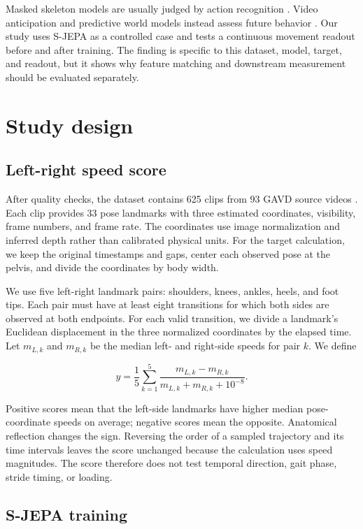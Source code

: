 \documentclass{article}
\begin{document}
Masked skeleton models are usually judged by action recognition
\citep{sjepa} \citep{mamp} \citep{slim}. Video anticipation and
predictive world models instead assess future behavior \citep{vjepa2}
\citep{seqjepa}. Our study uses S-JEPA as a controlled case and tests a
continuous movement readout before and after training. The finding is
specific to this dataset, model, target, and readout, but it shows why
feature matching and downstream measurement should be evaluated
separately.

\section{Study design}\label{study-design}

\subsection{Left-right speed score}\label{left-right-speed-score}

After quality checks, the dataset contains 625 clips from 93 GAVD source
videos \citep{gavd}. Each clip provides 33 pose landmarks with three
estimated coordinates, visibility, frame numbers, and frame rate. The
coordinates use image normalization and inferred depth rather than
calibrated physical units. For the target calculation, we keep the
original timestamps and gaps, center each observed pose at the pelvis,
and divide the coordinates by body width.

We use five left-right landmark pairs: shoulders, knees, ankles, heels,
and foot tips. Each pair must have at least eight transitions for which
both sides are observed at both endpoints. For each valid transition, we
divide a landmark's Euclidean displacement in the three normalized
coordinates by the elapsed time. Let \(m_{L,k}\) and \(m_{R,k}\) be the
median left- and right-side speeds for pair \(k\). We define

\[y=\frac{1}{5}\sum_{k=1}^{5}\frac{m_{L,k}-m_{R,k}}{m_{L,k}+m_{R,k}+10^{-8}}.\]

Positive scores mean that the left-side landmarks have higher median
pose-coordinate speeds on average; negative scores mean the opposite.
Anatomical reflection changes the sign. Reversing the order of a sampled
trajectory and its time intervals leaves the score unchanged because the
calculation uses speed magnitudes. The score therefore does not test
temporal direction, gait phase, stride timing, or loading.

\subsection{S-JEPA training}\label{s-jepa-training}
\end{document}
